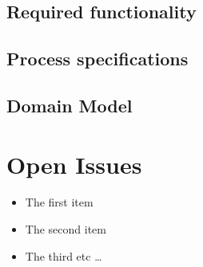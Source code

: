 \documentclass{article}
\begin{document}
		\subsection{Required functionality}
	
		\subsection{Process specifications}
		
		\subsection{Domain Model}
		
	\section{Open Issues}
		\begin{itemize}
		  \item The first item
		  \item The second item
		  \item The third etc \ldots
		\end{itemize}		
		
	
\end{document}
